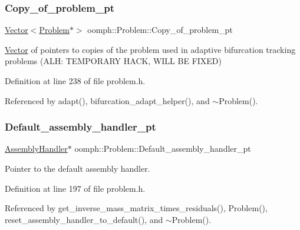 \subsubsection{\texorpdfstring{Copy\+\_\+of\+\_\+problem\+\_\+pt}{Copy\_of\_problem\_pt}}
{\footnotesize\ttfamily \hyperlink{classoomph_1_1Vector}{Vector}$<$\hyperlink{classoomph_1_1Problem}{Problem}$\ast$$>$ oomph\+::\+Problem\+::\+Copy\+\_\+of\+\_\+problem\+\_\+pt\hspace{0.3cm}{\ttfamily [protected]}}



\hyperlink{classoomph_1_1Vector}{Vector} of pointers to copies of the problem used in adaptive bifurcation tracking problems (A\+LH\+: T\+E\+M\+P\+O\+R\+A\+RY H\+A\+CK, W\+I\+LL BE F\+I\+X\+ED) 



Definition at line 238 of file problem.\+h.



Referenced by adapt(), bifurcation\+\_\+adapt\+\_\+helper(), and $\sim$\+Problem().

\mbox{\label{classoomph_1_1Problem_ae0cebe288c8daddd9663bd10d8f1caa0}} 
\subsubsection{\texorpdfstring{Default\+\_\+assembly\+\_\+handler\+\_\+pt}{Default\_assembly\_handler\_pt}}
{\footnotesize\ttfamily \hyperlink{classoomph_1_1AssemblyHandler}{Assembly\+Handler}$\ast$ oomph\+::\+Problem\+::\+Default\+\_\+assembly\+\_\+handler\+\_\+pt\hspace{0.3cm}{\ttfamily [private]}}



Pointer to the default assembly handler. 



Definition at line 197 of file problem.\+h.



Referenced by get\+\_\+inverse\+\_\+mass\+\_\+matrix\+\_\+times\+\_\+residuals(), Problem(), reset\+\_\+assembly\+\_\+handler\+\_\+to\+\_\+default(), and $\sim$\+Problem().

\mbox{\label{classoomph_1_1Problem_a39fd6a7e05c02befe9f2a09938a7a7a4}} 
